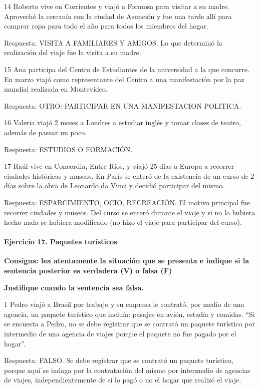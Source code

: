 \documentclass[
  openany]{book}
\begin{document}
14 Roberto vive en Corrientes y viajó a Formosa para visitar a su madre. Aprovechó la cercanía con la ciudad de Asunción y fue una tarde allí para comprar ropa para todo el año para todos los miembros del hogar.

Respuesta: VISITA A FAMILIARES Y AMIGOS. Lo que determinó la realización del viaje fue la visita a su madre.

15 Ana participa del Centro de Estudiantes de la universidad a la que concurre. En marzo viajó como representante del Centro a una manifestación por la paz mundial realizada en Montevideo.

Respuesta: OTRO: PARTICIPAR EN UNA MANIFESTACION POLITICA.

16 Valeria viajó 2 meses a Londres a estudiar inglés y tomar clases de teatro, además de pasear un poco.

Respuesta: ESTUDIOS O FORMACIÓN.

17 Raúl vive en Concordia, Entre Ríos, y viajó 25 días a Europa a recorrer ciudades históricas y museos. En París se enteró de la existencia de un curso de 2 días sobre la obra de Leonardo da Vinci y decidió participar del mismo.

Respuesta: ESPARCIMIENTO, OCIO, RECREACIÓN. El motivo principal fue recorrer ciudades y museos. Del curso se enteró durante el viaje y si no lo hubiera hecho nada se hubiera modificado (no hizo el viaje para participar del curso).

\hypertarget{ejercicio-17.-paquetes-turuxedsticos-1}{%
\paragraph{Ejercicio 17. Paquetes turísticos}\label{ejercicio-17.-paquetes-turuxedsticos-1}}

\textbf{Consigna: lea atentamente la situación que se presenta e indique si la sentencia posterior es verdadera (V) o falsa (F)}

\textbf{Justifique cuando la sentencia sea falsa.}

1 Pedro viajó a Brasil por trabajo y su empresa le contrató, por medio de una agencia, un paquete turístico que incluía: pasajes en avión, estadía y comidas.
``Si se encuesta a Pedro, no se debe registrar que se contrató un paquete turístico por intermedio de una agencia de viajes porque el paquete no fue pagado por el hogar''.

Respuesta: FALSO. Se debe registrar que se contrató un paquete turístico, porque aquí se indaga por la contratación del mismo por intermedio de agencias de viajes, independientemente de si lo pagó o no el hogar que realizó el viaje.
\end{document}
